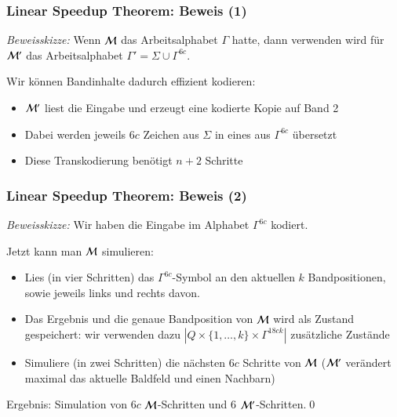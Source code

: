 \documentclass[onlymath]{beamer}
\begin{document}
\begin{frame}\frametitle{Linear Speedup Theorem: Beweis (1)}


\pause\emph{Beweisskizze:} Wenn $\mathcal{M}$ das Arbeitsalphabet $\Gamma$ hatte, dann verwenden wird für $\mathcal{M}'$ das Arbeitsalphabet $\Gamma'=\Sigma\cup\Gamma^{6c}$.
\bigskip

Wir können Bandinhalte dadurch effizient kodieren:
\begin{itemize}
\item $\mathcal{M}'$ liest die Eingabe und erzeugt eine kodierte Kopie auf Band 2
\item Dabei werden jeweils $6c$ Zeichen aus $\Sigma$ in eines aus $\Gamma^{6c}$ übersetzt
\item Diese Transkodierung benötigt $n+2$ Schritte
\end{itemize}


\end{frame}

\begin{frame}\frametitle{Linear Speedup Theorem: Beweis (2)}


\emph{Beweisskizze:} Wir haben die Eingabe im Alphabet $\Gamma^{6c}$ kodiert.
\pause\medskip

Jetzt kann man $\mathcal{M}$ simulieren:
\begin{itemize}
\item Lies (in vier Schritten) das $\Gamma^{6c}$-Symbol an den aktuellen $k$ Bandpositionen,
sowie jeweils links und rechts davon. 
\item Das Ergebnis und die genaue Bandposition von $\mathcal{M}$ wird als Zustand gespeichert: wir verwenden dazu
$|Q\times\{1,\ldots,k\}\times \Gamma^{18c k}|$ zusätzliche Zustände
\item Simuliere (in zwei Schritten) die nächsten $6c$ Schritte von $\mathcal{M}$
($\mathcal{M}'$ verändert maximal das aktuelle Baldfeld und einen Nachbarn)
\end{itemize}
Ergebnis: Simulation von $6c$ $\mathcal{M}$-Schritten und $6$ $\mathcal{M}'$-Schritten.\qed

\end{frame}
\end{document}

